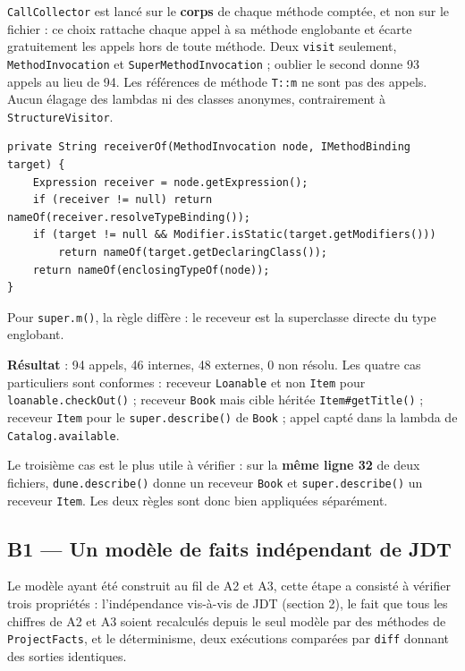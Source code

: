 \documentclass[11pt,a4paper]{article}
\begin{document}
\texttt{CallCollector} est lancé sur le \textbf{corps} de chaque méthode comptée, et non sur le fichier : ce choix rattache chaque appel à sa méthode englobante et écarte gratuitement les appels hors de toute méthode. Deux \texttt{visit} seulement, \texttt{MethodInvocation} et \texttt{SuperMethodInvocation} ; oublier le second donne 93 appels au lieu de 94. Les références de méthode \texttt{T::m} ne sont pas des appels. Aucun élagage des lambdas ni des classes anonymes, contrairement à \texttt{StructureVisitor}.

\begin{lstlisting}
private String receiverOf(MethodInvocation node, IMethodBinding target) {
    Expression receiver = node.getExpression();
    if (receiver != null) return nameOf(receiver.resolveTypeBinding());
    if (target != null && Modifier.isStatic(target.getModifiers()))
        return nameOf(target.getDeclaringClass());
    return nameOf(enclosingTypeOf(node));
}
\end{lstlisting}

Pour \texttt{super.m()}, la règle diffère : le receveur est la superclasse directe du type englobant.

\textbf{Résultat} : 94 appels, 46 internes, 48 externes, 0 non résolu. Les quatre cas particuliers sont conformes : receveur \texttt{Loanable} et non \texttt{Item} pour \texttt{loanable.checkOut()} ; receveur \texttt{Book} mais cible héritée \texttt{Item\#getTitle()} ; receveur \texttt{Item} pour le \texttt{super.describe()} de \texttt{Book} ; appel capté dans la lambda de \texttt{Catalog.available}.

Le troisième cas est le plus utile à vérifier : sur la \textbf{même ligne 32} de deux fichiers, \texttt{dune.describe()} donne un receveur \texttt{Book} et \texttt{super.describe()} un receveur \texttt{Item}. Les deux règles sont donc bien appliquées séparément.

\subsection{B1 --- Un modèle de faits indépendant de JDT}

Le modèle ayant été construit au fil de A2 et A3, cette étape a consisté à vérifier trois propriétés : l'indépendance vis-à-vis de JDT (section 2), le fait que tous les chiffres de A2 et A3 soient recalculés depuis le seul modèle par des méthodes de \texttt{ProjectFacts}, et le déterminisme, deux exécutions comparées par \texttt{diff} donnant des sorties identiques.
\end{document}

